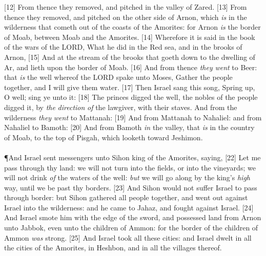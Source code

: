 [12] \textcolor[cmyk]{0.99998,1,0,0}{From thence they removed, and pitched in the valley of Zared.}
[13] \textcolor[cmyk]{0.99998,1,0,0}{From thence they removed, and pitched on the other side of Arnon, which \emph{is} in the wilderness that cometh out of the coasts of the Amorites: for Arnon \emph{is} the border of Moab, between Moab and the Amorites.}
[14] \textcolor[cmyk]{0.99998,1,0,0}{Wherefore it is said in the book of the wars of the LORD, What he did in the Red sea, and in the brooks of Arnon,}
[15] \textcolor[cmyk]{0.99998,1,0,0}{And at the stream of the brooks that goeth down to the dwelling of Ar, and lieth upon the border of Moab.}
[16] \textcolor[cmyk]{0.99998,1,0,0}{And from thence \emph{they} \emph{went} to Beer: that \emph{is} the well whereof the LORD spake unto Moses, Gather the people together, and I will give them water.}
[17] \textcolor[cmyk]{0.99998,1,0,0}{Then Israel sang this song, Spring up, O well; sing ye unto it:}
[18] \textcolor[cmyk]{0.99998,1,0,0}{The princes digged the well, the nobles of the people digged it, by \emph{the} \emph{direction} \emph{of} the lawgiver, with their staves. And from the wilderness \emph{they} \emph{went} to Mattanah:}
[19] \textcolor[cmyk]{0.99998,1,0,0}{And from Mattanah to Nahaliel: and from Nahaliel to Bamoth:}
[20] \textcolor[cmyk]{0.99998,1,0,0}{And from Bamoth \emph{in} the valley, that \emph{is} in the country of Moab, to the top of Pisgah, which looketh toward Jeshimon.}\\
\\
\P \textcolor[cmyk]{0.99998,1,0,0}{And Israel sent messengers unto Sihon king of the Amorites, saying,}
[22] \textcolor[cmyk]{0.99998,1,0,0}{Let me pass through thy land: we will not turn into the fields, or into the vineyards; we will not drink \emph{of} the waters of the well: \emph{but} we will go along by the king's \emph{high} way, until we be past thy borders.}
[23] \textcolor[cmyk]{0.99998,1,0,0}{And Sihon would not suffer Israel to pass through  border: but Sihon gathered all  people together, and went out against Israel into the wilderness: and he came to Jahaz, and fought against Israel.}
[24] \textcolor[cmyk]{0.99998,1,0,0}{And Israel smote him with the edge of the sword, and possessed  land from Arnon unto Jabbok, even unto the children of Ammon: for the border of the children of Ammon \emph{was} strong.}
[25] \textcolor[cmyk]{0.99998,1,0,0}{And Israel took all these cities: and Israel dwelt in all the cities of the Amorites, in Heshbon, and in all the villages thereof.}
